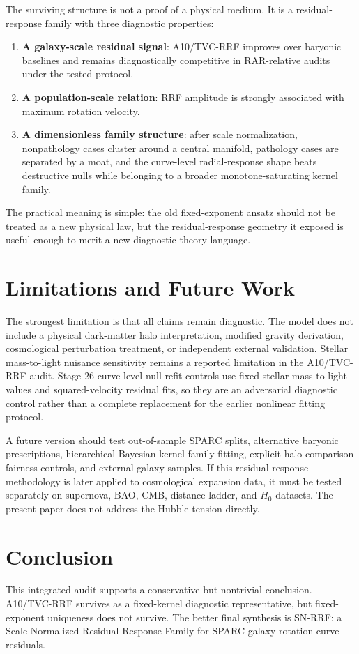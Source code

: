 \documentclass[11pt,a4paper]{article}
\begin{document}
The surviving structure is not a proof of a physical medium. It is a residual-response family with three diagnostic properties:
\begin{enumerate}
  \item \textbf{A galaxy-scale residual signal}: A10/TVC-RRF improves over baryonic baselines and remains diagnostically competitive in RAR-relative audits under the tested protocol.
  \item \textbf{A population-scale relation}: RRF amplitude is strongly associated with maximum rotation velocity.
  \item \textbf{A dimensionless family structure}: after scale normalization, nonpathology cases cluster around a central manifold, pathology cases are separated by a moat, and the curve-level radial-response shape beats destructive nulls while belonging to a broader monotone-saturating kernel family.
\end{enumerate}

The practical meaning is simple: the old fixed-exponent ansatz should not be treated as a new physical law, but the residual-response geometry it exposed is useful enough to merit a new diagnostic theory language.

\section{Limitations and Future Work}
The strongest limitation is that all claims remain diagnostic. The model does not include a physical dark-matter halo interpretation, modified gravity derivation, cosmological perturbation treatment, or independent external validation. Stellar mass-to-light nuisance sensitivity remains a reported limitation in the A10/TVC-RRF audit. Stage 26 curve-level null-refit controls use fixed stellar mass-to-light values and squared-velocity residual fits, so they are an adversarial diagnostic control rather than a complete replacement for the earlier nonlinear fitting protocol.

A future version should test out-of-sample SPARC splits, alternative baryonic prescriptions, hierarchical Bayesian kernel-family fitting, explicit halo-comparison fairness controls, and external galaxy samples. If this residual-response methodology is later applied to cosmological expansion data, it must be tested separately on supernova, BAO, CMB, distance-ladder, and $H_0$ datasets. The present paper does not address the Hubble tension directly.

\section{Conclusion}
This integrated audit supports a conservative but nontrivial conclusion. A10/TVC-RRF survives as a fixed-kernel diagnostic representative, but fixed-exponent uniqueness does not survive. The better final synthesis is SN-RRF: a Scale-Normalized Residual Response Family for SPARC galaxy rotation-curve residuals.
\end{document}
